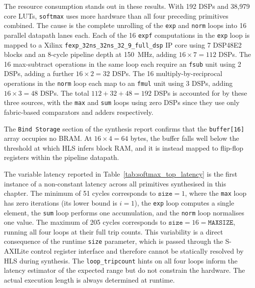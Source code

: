 The resource consumption stands out in these results. With 192 DSPs and 38{,}979 core LUTs,
\texttt{softmax} uses more hardware than all four preceding
primitives combined. The cause is the complete unrolling of the
\texttt{exp} and \texttt{norm} loops into 16 parallel datapath lanes
each. Each of the 16 \texttt{expf} computations in the \texttt{exp}
loop is mapped to a Xilinx \texttt{fexp\_32ns\_32ns\_32\_9\_full\_dsp}
IP core using 7 DSP48E2 blocks and an 8-cycle pipeline depth at
\SI{150}{\mega\hertz}, adding $16 \times 7 = 112$ DSPs. The 16
max-subtract operations in the same loop each require an \texttt{fsub}
unit using 2 DSPs, adding a further $16 \times 2 = 32$ DSPs.
The 16 multiply-by-reciprocal operations in the \texttt{norm} loop
each map to an \texttt{fmul} unit using 3 DSPs, adding $16 \times
3 = 48$ DSPs. The total $112 + 32 + 48 = 192$ DSPs is accounted for
by these three sources, with the \texttt{max} and \texttt{sum}
loops using zero DSPs since they use only fabric-based
comparators and adders respectively.

The \texttt{Bind Storage} section of the synthesis report confirms that
the \texttt{buffer[16]} array occupies no BRAM. At $16 \times 4 = 64$
bytes, the buffer falls well below the threshold at which HLS infers
block RAM, and it is instead mapped to flip-flop registers within the
pipeline datapath.

The variable latency reported in Table~\ref{tab:softmax_top_latency}
is the first instance of a non-constant latency across all primitives
synthesised in this chapter. The minimum of 51 cycles corresponds to
$\texttt{size} = 1$, where the \texttt{max} loop
has zero iterations (its lower bound is $i = 1$), the \texttt{exp}
loop computes a single element, the \texttt{sum} loop performs one
accumulation, and the \texttt{norm} loop normalises one value. The
maximum of 205 cycles corresponds to $\texttt{size} = 16 =
\texttt{MAXSIZE}$, running all four loops at their full trip counts.
This variability is a direct consequence of the runtime \texttt{size}
parameter, which is passed through the S-AXILite control register
interface and therefore cannot be statically resolved by HLS during
synthesis. The \texttt{loop\_tripcount} hints on all four loops inform
the latency estimator of the expected range but do not constrain the
hardware. The actual execution length is always determined at runtime.

